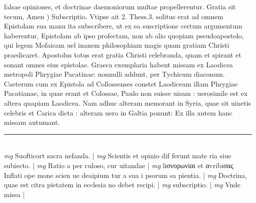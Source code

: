 \documentclass{article}
\begin{document}
\begin{pages}
falsae opiniones, et doctrinae daemoniorum multae propellerentur.  \pend\pstart Gratia sit tecum, Amen ) Subscriptio. Vtipse ait 2. Thess.3. solitus erat ad omnem Epistolam sua manu ita subscribere, ut ex ea suscriptione certum argumentum haberentur, Epistolam ab ipso profectam, non ab alio quopiam pseudoapostolo, qui legem Mofaicam uel inanem philosophiam magis quam gratiam Christi praedicaret. Apostolus totus erat gratia Christi celebranda, quam et spirant et sonant omnes eius epistolae. Graeca exemplaria habent missam ex Laodicea metropoli Phrygiae Pacatinae: nonnulli addunt, per Tychicum diaconum. Caeterum cum ex Epistola ad Collossenses constet Laodiceam illam Phrygiae Pacatianae, in quae erant et Colossae, Paulo non suisse uisam : uerosimile est ex altera quapiam Laodicea. Nam adhuc alteram memorant in Syria, quae sit uinetis celebris et Carica dicta : alteram uero in Galtia ponunt: Ex illa autem hanc missam autumant.  \pend
\vspace{0.5cm}\noindent
\vspace{0.2cm}\rule{1cm}{0.2pt}\\ 
\hspace{0.2cm}\textit{mg}
\footnotesize Suofticort sacra nefanda. 
\normalsize| 
\hspace{0.2cm}\textit{mg}
\footnotesize Scientis et opinio dif ferunt mate ria siue subiecto. 
\normalsize| 
\hspace{0.2cm}\textit{mg}
\footnotesize Ratio a per culoso, cur uitandae 
\normalsize| 
\hspace{0.2cm}\textit{mg}
\footnotesize lισνορωνίαι et αvribiσας Inflati ope mone scien ue deaipium tur a sua i psorum sa pientia. 
\normalsize| 
\hspace{0.2cm}\textit{mg}
\footnotesize Doctrina, quae est citra pietatem in ecclesia no debet recipi. 
\normalsize| 
\hspace{0.2cm}\textit{mg}
\footnotesize subscriptio. 
\normalsize| 
\hspace{0.2cm}\textit{mg}
\footnotesize Vnde missa 
\normalsize| 
\endnumbering
\end{pages}
\end{document}
